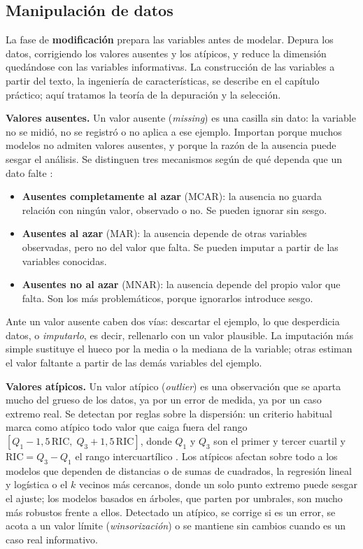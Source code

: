 \documentclass[12pt,a4paper]{report}
\theoremstyle{definition}
\begin{document}
\subsection{Manipulación de datos}

La fase de \textbf{modificación} prepara las variables antes de modelar. Depura los datos, corrigiendo
los valores ausentes y los atípicos, y reduce la dimensión quedándose con las variables informativas.
La construcción de las variables a partir del texto, la ingeniería de características, se describe en el
capítulo práctico; aquí tratamos la teoría de la depuración y la selección.

\medskip
\noindent\textbf{Valores ausentes.} Un valor ausente (\emph{missing}) es una casilla sin dato: la
variable no se midió, no se registró o no aplica a ese ejemplo. Importan porque muchos modelos no
admiten valores ausentes, y porque la razón de la ausencia puede sesgar el análisis. Se distinguen tres
mecanismos según de qué dependa que un dato falte \cite{little2019missing}:
\begin{itemize}
\item \textbf{Ausentes completamente al azar} (MCAR): la ausencia no guarda relación con ningún valor,
observado o no. Se pueden ignorar sin sesgo.
\item \textbf{Ausentes al azar} (MAR): la ausencia depende de otras variables observadas, pero no del
valor que falta. Se pueden imputar a partir de las variables conocidas.
\item \textbf{Ausentes no al azar} (MNAR): la ausencia depende del propio valor que falta. Son los más
problemáticos, porque ignorarlos introduce sesgo.
\end{itemize}
Ante un valor ausente caben dos vías: descartar el ejemplo, lo que desperdicia datos, o
\emph{imputarlo}, es decir, rellenarlo con un valor plausible. La imputación más simple sustituye el hueco
por la media o la mediana de la variable; otras estiman el valor faltante a partir de las demás
variables del ejemplo.

\medskip
\noindent\textbf{Valores atípicos.} Un valor atípico (\emph{outlier}) es una observación que se aparta
mucho del grueso de los datos, ya por un error de medida, ya por un caso extremo real. Se detectan por
reglas sobre la dispersión: un criterio habitual marca como atípico todo valor que caiga fuera del
rango $[Q_1 - 1{,}5\,\mathrm{RIC},\; Q_3 + 1{,}5\,\mathrm{RIC}]$, donde $Q_1$ y $Q_3$ son el primer y
tercer cuartil y $\mathrm{RIC}=Q_3-Q_1$ el rango intercuartílico \cite{tukey1977eda}. Los atípicos afectan sobre todo a
los modelos que dependen de distancias o de sumas de cuadrados, la regresión lineal y logística o el
$k$ vecinos más cercanos, donde un solo punto extremo puede sesgar el ajuste; los modelos basados en
árboles, que parten por umbrales, son mucho más robustos frente a ellos. Detectado un atípico, se
corrige si es un error, se acota a un valor límite (\emph{winsorización}) o se mantiene sin cambios cuando es
un caso real informativo.
\end{document}
